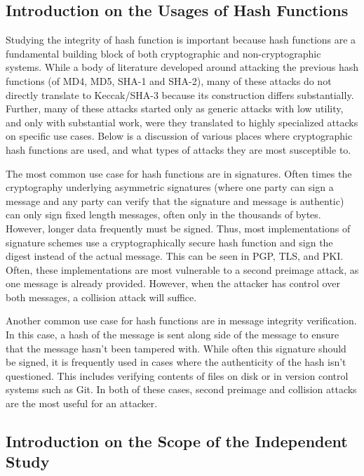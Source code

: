 \documentclass[10pt,twocolumn,twoside]{pnas-new}
\begin{document}
\subsection{Introduction on the Usages of Hash Functions}

    Studying the integrity of hash function is important because hash functions
are a fundamental building block of both cryptographic and non-cryptographic
systems. While a body of literature developed around attacking the previous
hash functions (of MD4, MD5, SHA-1 and SHA-2), many of these attacks do not
directly translate to Keccak/SHA-3 because its construction differs
substantially. Further, many of these attacks started only as generic attacks
with low utility, and only with substantial work, were they translated to
highly specialized attacks on specific use cases. Below is a discussion of
various places where cryptographic hash functions are used, and what types of
attacks they are most susceptible to.

    The most common use case for hash functions are in signatures. Often times
the cryptography underlying asymmetric signatures (where one party can sign a
message and any party can verify that the signature and message is authentic)
can only sign fixed length messages, often only in the thousands of bytes.
However, longer data frequently must be signed. Thus, most implementations of
signature schemes use a cryptographically secure hash function and sign the
digest instead of the actual message. This can be seen in PGP, TLS, and PKI.
Often, these implementations are most vulnerable to a second preimage attack,
as one message is already provided. However, when the attacker has control
over both messages, a collision attack will suffice.

    Another common use case for hash functions are in message integrity
verification. In this case, a hash of the message is sent along side of the
message to ensure that the message hasn't been tampered with. While often this
signature should be signed, it is frequently used in cases where the
authenticity of the hash isn't questioned. This includes verifying contents of
files on disk or in version control systems such as Git. In both of these
cases, second preimage and collision attacks are the most useful for an
attacker.

\subsection{Introduction on the Scope of the Independent Study}
\end{document}
